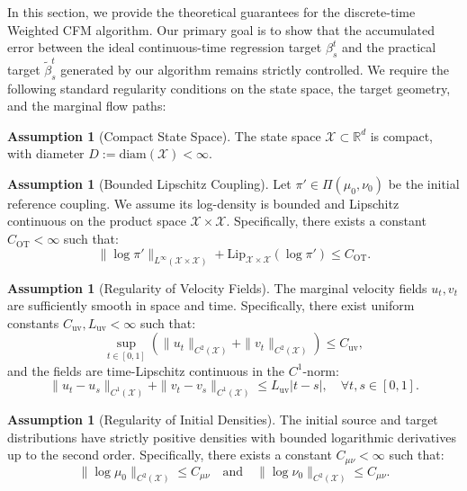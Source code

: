 \documentclass[11pt]{article}
\theoremstyle{definition}
\newtheorem{assumption}[theorem]{Assumption}
\numberwithin{equation}{section}%
\begin{document}
{In this section, we provide the theoretical guarantees for the discrete-time Weighted CFM algorithm. Our primary goal is to show that the accumulated error between the ideal continuous-time regression target $\beta_s^t$ and the practical target $\tilde{\beta}_s^t$ generated by our algorithm remains strictly controlled. We require the following standard regularity conditions on the state space, the target geometry, and the marginal flow paths:

\begin{assumption}[Compact State Space]
\label{ass:compact_X}
The state space $\mathcal X \subset \mathbb R^d$ is compact, with diameter $D := \mathrm{diam}(\mathcal X) < \infty$.
\end{assumption}

\begin{assumption}[Bounded Lipschitz Coupling]
\label{ass:coupling_regularity}
Let $\pi' \in \Pi(\mu_0, \nu_0)$ be the initial reference coupling. We assume its log-density is bounded and Lipschitz continuous on the product space $\mathcal{X} \times \mathcal{X}$. Specifically, there exists a constant $C_\mathrm{OT} < \infty$ such that:
\begin{equation}
\|\log \pi'\|_{L^\infty(\mathcal{X} \times \mathcal{X})} + \mathrm{Lip}_{\mathcal{X} \times \mathcal{X}}(\log \pi') \le C_\mathrm{OT}.
\end{equation}
\end{assumption}

\begin{assumption}[Regularity of Velocity Fields]
\label{ass:velocity_regularity}
The marginal velocity fields $u_t, v_t$ are sufficiently smooth in space and time. Specifically, there exist uniform constants $C_\mathrm{uv}, L_\mathrm{uv} < \infty$ such that:
\begin{equation}
\sup_{t \in [0,1]} \left( \|u_t\|_{C^2(\mathcal{X})} + \|v_t\|_{C^2(\mathcal{X})} \right) \le C_\mathrm{uv},
\end{equation}
and the fields are time-Lipschitz continuous in the $C^1$-norm:
\begin{equation}
\|u_t - u_s\|_{C^1(\mathcal{X})} + \|v_t - v_s\|_{C^1(\mathcal{X})} \le L_\mathrm{uv} |t - s|, \quad \forall t, s \in [0,1].
\end{equation}
\end{assumption}

\begin{assumption}[Regularity of Initial Densities]
\label{ass:initial_regularity}
The initial source and target distributions have strictly positive densities with bounded logarithmic derivatives up to the second order. Specifically, there exists a constant $C_{\mu \nu} < \infty$ such that:
\begin{equation}
\|\log \mu_0\|_{C^2(\mathcal{X})} \le C_{\mu \nu} \quad \text{and} \quad \|\log \nu_0\|_{C^2(\mathcal{X})} \le C_{\mu \nu}.
\end{equation}
\end{assumption}

}
\end{document}
